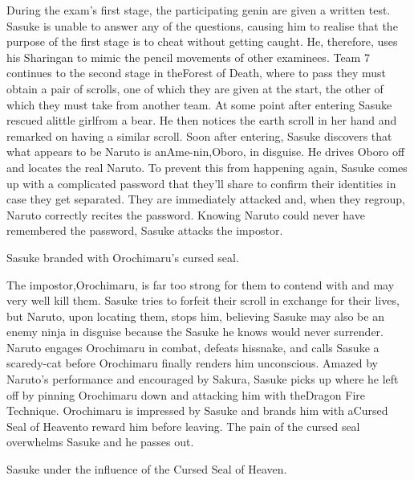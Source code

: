 \documentclass[a4paper,12pt]{article}
\begin{document}
During the exam's first stage, the participating genin are given a written test. Sasuke is unable to answer any of the questions, causing him to realise that the purpose of the first stage is to cheat without getting caught. He, therefore, uses his Sharingan to mimic the pencil movements of other examinees. Team 7 continues to the second stage in theForest of Death, where to pass they must obtain a pair of scrolls, one of which they are given at the start, the other of which they must take from another team. At some point after entering Sasuke rescued alittle girlfrom a bear. He then notices the earth scroll in her hand and remarked on having a similar scroll. Soon after entering, Sasuke discovers that what appears to be Naruto is anAme-nin,Oboro, in disguise. He drives Oboro off and locates the real Naruto. To prevent this from happening again, Sasuke comes up with a complicated password that they'll share to confirm their identities in case they get separated. They are immediately attacked and, when they regroup, Naruto correctly recites the password. Knowing Naruto could never have remembered the password, Sasuke attacks the impostor.\\ \par \vspace{0.5cm}

Sasuke branded with Orochimaru's cursed seal.\\ \par \vspace{0.5cm}

The impostor,Orochimaru, is far too strong for them to contend with and may very well kill them. Sasuke tries to forfeit their scroll in exchange for their lives, but Naruto, upon locating them, stops him, believing Sasuke may also be an enemy ninja in disguise because the Sasuke he knows would never surrender. Naruto engages Orochimaru in combat, defeats hissnake, and calls Sasuke a scaredy-cat before Orochimaru finally renders him unconscious. Amazed by Naruto's performance and encouraged by Sakura, Sasuke picks up where he left off by pinning Orochimaru down and attacking him with theDragon Fire Technique. Orochimaru is impressed by Sasuke and brands him with aCursed Seal of Heavento reward him before leaving. The pain of the cursed seal overwhelms Sasuke and he passes out.\\ \par \vspace{0.5cm}

Sasuke under the influence of the Cursed Seal of Heaven.\\ \par \vspace{0.5cm}
\end{document}
